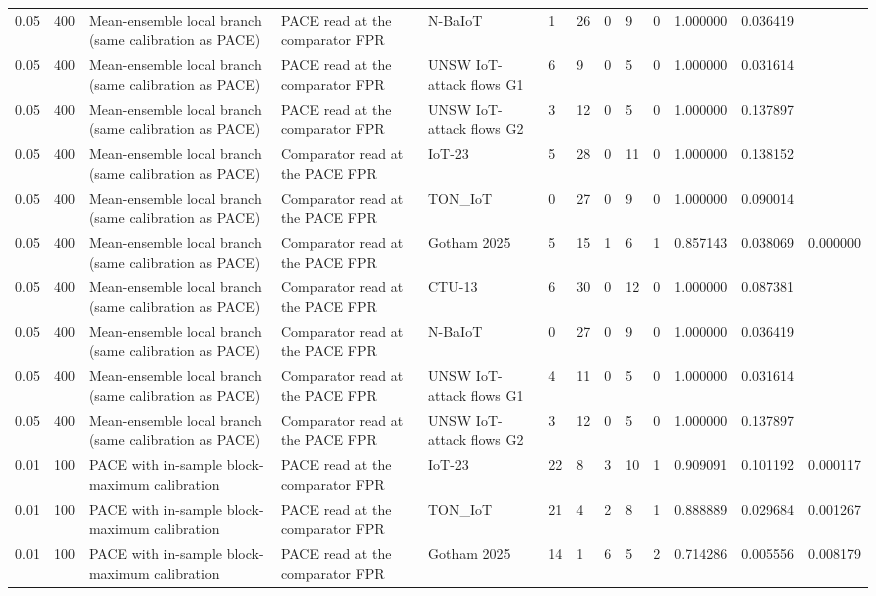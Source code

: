 \begin{tabular}{lllllllllllll}
0.05 & 400 & Mean-ensemble local branch (same calibration as PACE) & PACE read at the comparator FPR & N-BaIoT & 1 & 26 & 0 & 9 & 0 & 1.000000 & 0.036419 &  \\
0.05 & 400 & Mean-ensemble local branch (same calibration as PACE) & PACE read at the comparator FPR & UNSW IoT-attack flows G1 & 6 & 9 & 0 & 5 & 0 & 1.000000 & 0.031614 &  \\
0.05 & 400 & Mean-ensemble local branch (same calibration as PACE) & PACE read at the comparator FPR & UNSW IoT-attack flows G2 & 3 & 12 & 0 & 5 & 0 & 1.000000 & 0.137897 &  \\
0.05 & 400 & Mean-ensemble local branch (same calibration as PACE) & Comparator read at the PACE FPR & IoT-23 & 5 & 28 & 0 & 11 & 0 & 1.000000 & 0.138152 &  \\
0.05 & 400 & Mean-ensemble local branch (same calibration as PACE) & Comparator read at the PACE FPR & TON\_IoT & 0 & 27 & 0 & 9 & 0 & 1.000000 & 0.090014 &  \\
0.05 & 400 & Mean-ensemble local branch (same calibration as PACE) & Comparator read at the PACE FPR & Gotham 2025 & 5 & 15 & 1 & 6 & 1 & 0.857143 & 0.038069 & 0.000000 \\
0.05 & 400 & Mean-ensemble local branch (same calibration as PACE) & Comparator read at the PACE FPR & CTU-13 & 6 & 30 & 0 & 12 & 0 & 1.000000 & 0.087381 &  \\
0.05 & 400 & Mean-ensemble local branch (same calibration as PACE) & Comparator read at the PACE FPR & N-BaIoT & 0 & 27 & 0 & 9 & 0 & 1.000000 & 0.036419 &  \\
0.05 & 400 & Mean-ensemble local branch (same calibration as PACE) & Comparator read at the PACE FPR & UNSW IoT-attack flows G1 & 4 & 11 & 0 & 5 & 0 & 1.000000 & 0.031614 &  \\
0.05 & 400 & Mean-ensemble local branch (same calibration as PACE) & Comparator read at the PACE FPR & UNSW IoT-attack flows G2 & 3 & 12 & 0 & 5 & 0 & 1.000000 & 0.137897 &  \\
0.01 & 100 & PACE with in-sample block-maximum calibration & PACE read at the comparator FPR & IoT-23 & 22 & 8 & 3 & 10 & 1 & 0.909091 & 0.101192 & 0.000117 \\
0.01 & 100 & PACE with in-sample block-maximum calibration & PACE read at the comparator FPR & TON\_IoT & 21 & 4 & 2 & 8 & 1 & 0.888889 & 0.029684 & 0.001267 \\
0.01 & 100 & PACE with in-sample block-maximum calibration & PACE read at the comparator FPR & Gotham 2025 & 14 & 1 & 6 & 5 & 2 & 0.714286 & 0.005556 & 0.008179 \\

\end{tabular}
